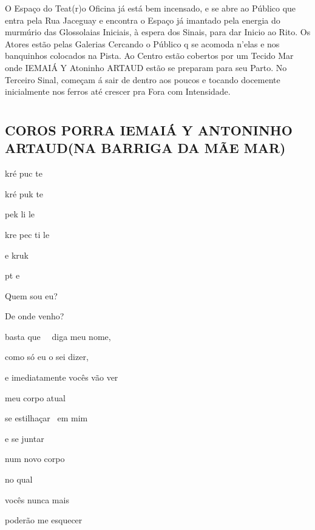 \mbox{}\vfill
\begin{flushleft}
O Espaço do Teat(r)o Oficina já está bem incensado, e se abre ao
Público que entra pela Rua Jaceguay e encontra o Espaço já imantado
pela energia do murmúrio das Glossolaias Iniciais, à espera dos Sinais,
para dar Inicio ao Rito. Os Atores estão pelas Galerias Cercando o
Público q se acomoda n'elas e nos banquinhos colocados na Pista. Ao
Centro estão cobertos por um Tecido Mar onde IEMAIÁ Y Atoninho ARTAUD
estão se preparam para seu Parto. No Terceiro Sinal, começam á sair de
dentro aos poucos e tocando docemente inicialmente nos ferros até
crescer pra Fora com Intensidade.
\end{flushleft}

\chapter*{}
\section*{COROS PORRA IEMAIÁ Y ANTONINHO ARTAUD\break (NA BARRIGA DA MÃE MAR)}

\begin{center}
kré puc te

kré puk te

pek li le

kre pec ti le

e kruk

pt e
\end{center}



Quem sou eu?

De onde venho?

basta que~~ diga meu nome,

como só eu o sei dizer,

e imediatamente vocês vão ver

meu corpo atual

se estilhaçar~ em mim

e se juntar

num novo corpo

no qual

vocês nunca mais

poderão me esquecer


